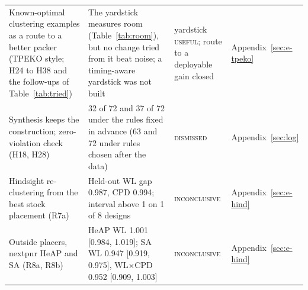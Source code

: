 \begin{table}[t]
\begin{tabular}{@{}p{4.1cm}p{7.3cm}p{2.2cm}p{3.0cm}@{}}
Known-optimal clustering examples as a route to a better packer (TPEKO style; H24 to H38 and the follow-ups of Table~\ref{tab:tried}) & The yardstick measures room (Table~\ref{tab:room}), but no change tried from it beat noise; a timing-aware yardstick was not built & yardstick \textsc{useful}; route to a deployable gain closed & Appendix~\ref{sec:e-tpeko} \\
Synthesis keeps the construction; zero-violation check (H18, H28) & 32 of 72 and 37 of 72 under the rules fixed in advance (63 and 72 under rules chosen after the data) & \textsc{dismissed} & Appendix~\ref{sec:log} \\
Hindsight re-clustering from the best stock placement (R7a) & Held-out WL gap 0.987, CPD 0.994; interval above 1 on 1 of 8 designs & \textsc{inconclusive} & Appendix~\ref{sec:e-hind} \\
Outside placers, nextpnr HeAP and SA (R8a, R8b) & HeAP WL 1.001 [0.984, 1.019]; SA WL 0.947 [0.919, 0.975], WL$\times$CPD 0.952 [0.909, 1.003] & \textsc{inconclusive} & Appendix~\ref{sec:e-hind} \\
\bottomrule
\end{tabular}
\end{table}

